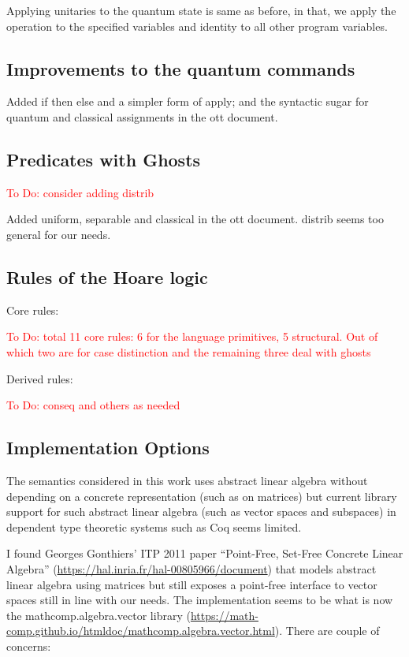 \documentclass[acmsmall,nonacm,timestamp,review=false,anonymous=false]{acmart}
\newcommand{\todo}[1]{\textcolor{red}{#1}}
\begin{document}
Applying unitaries to the quantum state is same as before, in that, we apply the operation to the specified variables and identity to all other program variables.


\subsection{Improvements to the quantum commands}

Added if then else and a simpler form of apply; and the syntactic sugar for quantum and classical assignments in the ott document.

\subsection{Predicates with Ghosts}
\todo{To Do: consider adding distrib}

Added uniform, separable and classical in the ott document. distrib seems too general for our needs.

\subsection{Rules of the Hoare logic}

Core rules:

\todo{To Do: total 11 core rules: 6 for the language primitives, 5 structural. Out of which two are for case distinction and the remaining three deal with ghosts}

Derived rules:

\todo{To Do: conseq and others as needed}

\subsection{Implementation Options}

The semantics considered in this work uses abstract linear algebra without depending on a concrete representation (such as on matrices) but current library support for such abstract linear algebra (such as vector spaces and subspaces) in dependent type theoretic systems such as Coq seems limited.

I found Georges Gonthiers' ITP 2011 paper ``Point-Free, Set-Free Concrete Linear Algebra'' (\url{https://hal.inria.fr/hal-00805966/document}) that models abstract linear algebra using matrices but still exposes a point-free interface to vector spaces still in line with our needs. The implementation seems to be what is now the mathcomp.algebra.vector library (\url{https://math-comp.github.io/htmldoc/mathcomp.algebra.vector.html}). There are couple of concerns:
\end{document}
